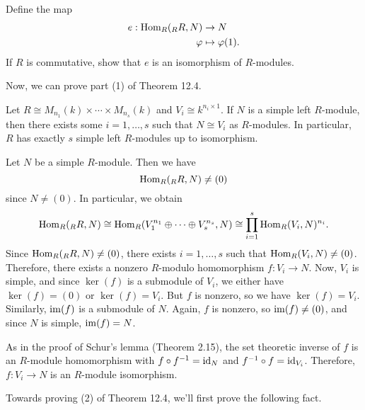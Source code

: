 \begin{exercise}{}
    Define the map 
    \begin{align*} 
        e : \operatorname{Hom}_R({}_R R, N) &\to N \\ \varphi &\mapsto \varphi(1). 
    \end{align*}
    If $R$ is commutative, show that $e$ is an isomorphism of $R$-modules. 
\end{exercise}

Now, we can prove part (1) of Theorem 12.4. 

\begin{theo}{}
    Let $R \cong M_{n_1}(k) \times \cdots \times M_{n_s}(k)$ and $V_i 
    \cong k^{n_i \times 1}$. If $N$ is a simple left $R$-module, then there 
    exists some $i = 1, \dots, s$ such that $N \cong V_i$ as $R$-modules. 
    In particular, $R$ has exactly $s$ simple left $R$-modules up to 
    isomorphism. 
\end{theo}
\begin{pf}
    Let $N$ be a simple $R$-module. Then we have 
    \[ \operatorname{Hom}_R({}_R R, N) \neq (0) \] 
    since $N \neq (0)$. In particular, we obtain 
    \[ \operatorname{Hom}_R({}_R R, N) \cong \operatorname{Hom}_R(V_1^{n_1} \oplus \cdots \oplus V_s^{n_s}, 
    N) \cong \prod_{i=1}^s \operatorname{Hom}_R(V_i, N)^{n_i}. \] 
    Since $\operatorname{Hom}_R({}_R R, N) \neq (0)$, there exists $i = 1, \dots, s$ 
    such that $\operatorname{Hom}_R(V_i, N) \neq (0)$. Therefore, there exists a 
    nonzero $R$-modulo homomorphism $f : V_i \to N$. Now, $V_i$ is simple, 
    and since $\ker(f)$ is a submodule of $V_i$, we either have $\ker(f) 
    = (0)$ or $\ker(f) = V_i$. But $f$ is nonzero, so we have $\ker(f) = V_i$. 
    Similarly, $\operatorname{im}(f)$ is a submodule of $N$. Again, $f$ is nonzero, so 
    $\operatorname{im}(f) \neq (0)$, and since $N$ is simple, $\operatorname{im}(f) = N$. 

    As in the proof of Schur's lemma (Theorem 2.15), the set theoretic 
    inverse of $f$ is an $R$-module homomorphism with $f \circ f^{-1} 
    = \operatorname{id}_N$ and $f^{-1} \circ f = \operatorname{id}_{V_i}$. Therefore, $f : V_i \to N$ is 
    an $R$-module isomorphism. 
\end{pf}

Towards proving (2) of Theorem 12.4, we'll first prove the following fact. 

